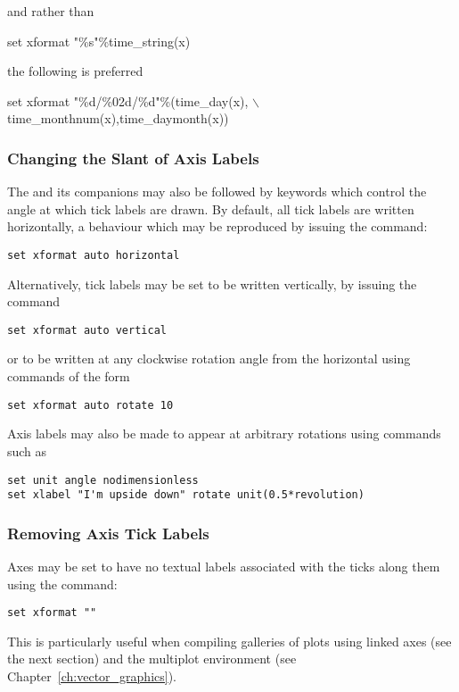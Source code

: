 \noindent and rather than

\begin{dontdo}
set xformat "\%s"\%time\_string(x)
\end{dontdo}

\noindent the following is preferred

\begin{dodo}
set xformat "\%d/\%02d/\%d"\%(time\_day(x), $\backslash$\newline time\_monthnum(x),time\_daymonth(x))
\end{dodo}

\subsubsection{Changing the Slant of Axis Labels}

The  and its companions may also be followed by keywords
which control the angle at which tick labels are drawn. By default, all tick
labels are written horizontally, a behaviour which may be reproduced by issuing
the command:
\begin{verbatim}
set xformat auto horizontal
\end{verbatim}
Alternatively, tick labels may be set to be written vertically, by issuing the command
\begin{verbatim}
set xformat auto vertical
\end{verbatim}
or to be written at any clockwise rotation angle from the horizontal using commands of the form
\begin{verbatim}
set xformat auto rotate 10
\end{verbatim}

Axis labels may also be made to appear at arbitrary rotations using commands such as
\begin{verbatim}
set unit angle nodimensionless
set xlabel "I'm upside down" rotate unit(0.5*revolution)
\end{verbatim}

\subsubsection{Removing Axis Tick Labels}

Axes may be set to have no textual labels associated with the ticks along them
using the command:
\begin{verbatim}
set xformat ""
\end{verbatim}
This is particularly useful when compiling galleries of plots using linked axes
(see the next section) and the multiplot environment (see
Chapter~\ref{ch:vector_graphics}).

